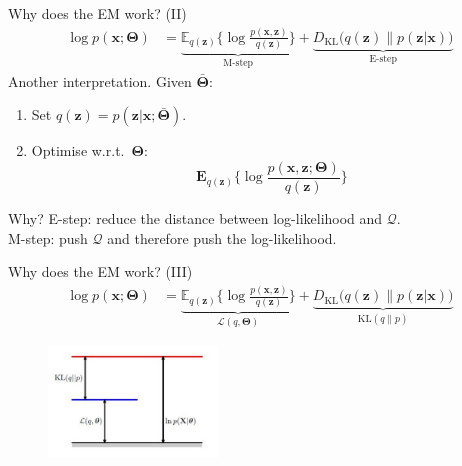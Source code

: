 \documentclass{beamer}
\newcommand{\bs}[1]{\boldsymbol{#1}}
\begin{document}
\begin{frame}{Why does the EM work? (II)}
 \begin{align}
\log p(\bs{x};\bs{\Theta}) &= \underbrace{\mathbb{E}_{q(\bs{z})}\Big\{\log \frac{p(\bs{x},\bs{z})}{q(\bs{z})}\Big\}}_{\text{M-step}} +  \underbrace{D_{\text{KL}}\Big(q(\bs{z})\Big\lVert p(\bs{z}|\bs{x})\Big)}_{\text{E-step}}
\end{align}
Another interpretation. Given $\bar{\bs{\Theta}}$:
\begin{enumerate}
 \item Set $q(\bs{z})=p(\bs{z}|\bs{x};\bar{\bs{\Theta}})$.
 \item Optimise w.r.t.\ $\bs{\Theta}$:\vspace{-3mm}
 \begin{equation} \mathbf{E}_{q(\bs{z})} \Big\{\log \frac{p(\bs{x},\bs{z};\bs{\Theta})}{q(\bs{z})}\Big\} \end{equation}
\end{enumerate}
\begin{block}{Why?}
  E-step: reduce the distance between log-likelihood and $\mathcal{Q}$.\\
  M-step: push $\mathcal{Q}$ and therefore push the log-likelihood.
\end{block}
\end{frame}

\begin{frame}{Why does the EM work? (III)}
\begin{align}
\log p(\bs{x};\bs{\Theta}) &= \underbrace{\mathbb{E}_{q(\bs{z})}\Big\{\log \frac{p(\bs{x},\bs{z})}{q(\bs{z})}\Big\}}_{ \mathcal{L}(q,\bs{\Theta}) } +  \underbrace{D_{\text{KL}}\Big(q(\bs{z})\Big\lVert p(\bs{z}|\bs{x})\Big)}_{\textrm{KL}(q\lVert p)}
\end{align}
 
\begin{figure}
 \centering
 \includegraphics[width=0.4\textwidth]{fig/em-gap.jpg}
\end{figure}
\end{frame}
\end{document}
